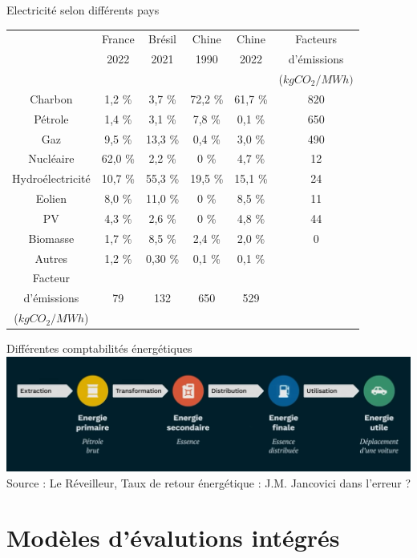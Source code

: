 \documentclass{beamer}
\begin{document}
\begin{frame}{Electricité selon différents pays}
\begin{tabular}{c|c|c|c|c|c}
 & France & Brésil & Chine & Chine &Facteurs\\
 &2022 & 2021 & 1990 & 2022 &  d'émissions \\
 & & & & & ($kgCO_2/MWh)$\\ \hline
Charbon &1,2 \% & 3,7 \% & 72,2 \% & 61,7 \% & 820 \\ 
Pétrole &1,4 \% & 3,1 \% & 7,8 \% & 0,1 \% & 650 \\
Gaz &9,5 \% & 13,3 \% & 0,4 \% & 3,0 \% & 490 \\
Nucléaire & 62,0 \% & 2,2 \% & 0 \% & 4,7 \% & 12 \\
Hydroélectricité & 10,7 \% & 55,3 \% & 19,5 \% & 15,1 \% & 24\\
 Eolien &8,0 \% & 11,0 \% & 0 \% & 8,5 \% & 11\\
  PV &4,3 \% &2,6 \% & 0 \% & 4,8 \% & 44\\
  Biomasse & 1,7 \% &8,5 \% & 2,4 \% & 2,0 \% & 0 \\ 
  Autres & 1,2 \% & 0,30 \% & 0,1 \% & 0,1 \% \\\hline
  Facteur & & & & \\
  d'émissions & 79 & 132 & 650 & 529 \\
  ($kgCO_2/MWh$) & & & &
\end{tabular}

\end{frame}

\begin{frame}{Différentes comptabilités énergétiques}
\centering
\includegraphics[scale=0.18]{images/energies_reveilleur.png}
\footnotesize{Source : Le Réveilleur, Taux de retour énergétique : J.M. Jancovici dans l'erreur ?}
\end{frame}



\section{Modèles d'évalutions intégrés}
\end{document}

